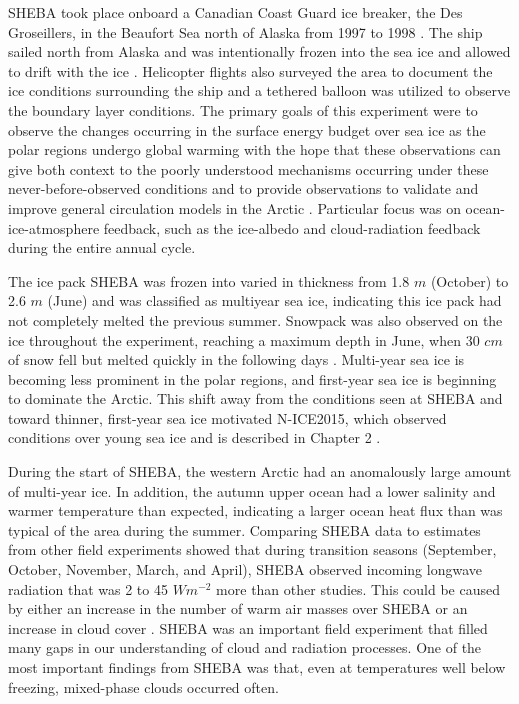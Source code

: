 SHEBA took place onboard a Canadian Coast Guard ice breaker, the Des Groseillers, in the Beaufort Sea north of Alaska from 1997 to 1998 \citep{uttal:2002, shupe:2004}. The ship sailed north from Alaska and was intentionally frozen into the sea ice and allowed to drift with the ice \citep{uttal:2002}. Helicopter flights also surveyed the area to document the ice conditions surrounding the ship and a tethered balloon was utilized to observe the boundary layer conditions. The primary goals of this experiment were to observe the changes occurring in the surface energy budget over sea ice as the polar regions undergo global warming with the hope that these observations can give both context to the poorly understood mechanisms occurring under these never-before-observed conditions and to provide observations to validate and improve general circulation models in the Arctic \citep{uttal:2002}. Particular focus was on ocean-ice-atmosphere feedback, such as the ice-albedo and cloud-radiation feedback during the entire annual cycle. 

The ice pack SHEBA was frozen into varied in thickness from 1.8 $m$ (October) to 2.6 $m$ (June) and was classified as multiyear sea ice, indicating this ice pack had not completely melted the previous summer. Snowpack was also observed on the ice throughout the experiment, reaching a maximum depth in June, when 30 $cm$ of snow fell but melted quickly in the following days \citep{uttal:2002}. Multi-year sea ice is becoming less prominent in the polar regions, and first-year sea ice is beginning to dominate the Arctic. This shift away from the conditions seen at SHEBA and toward thinner, first-year sea ice motivated N-ICE2015, which observed conditions over young sea ice and is described in Chapter 2 \citep{graham:2017}. 

During the start of SHEBA, the western Arctic had an anomalously large amount of multi-year ice. In addition, the autumn upper ocean had a lower salinity and warmer temperature than expected, indicating a larger ocean heat flux than was typical of the area during the summer. Comparing SHEBA data to estimates from other field experiments showed that during transition seasons (September, October, November, March, and April), SHEBA observed incoming longwave radiation that was 2 to 45 $Wm^{-2}$ more than other studies. This could be caused by either an increase in the number of warm air masses over SHEBA or an increase in cloud cover \citep{persson:2002}. SHEBA was an important field experiment that filled many gaps in our understanding of cloud and radiation processes. One of the most important findings from SHEBA was that, even at temperatures well below freezing, mixed-phase clouds occurred often. 

